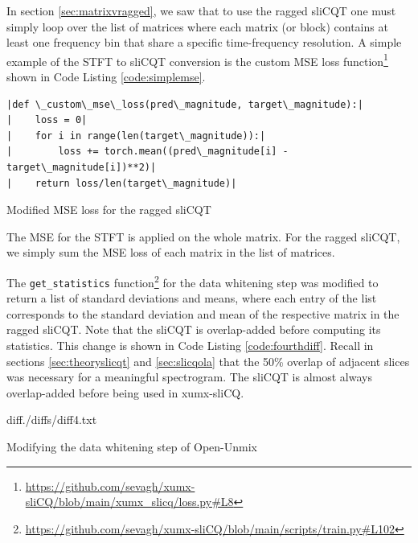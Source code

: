 \documentclass[report.tex]{subfiles}
\begin{document}
In section \ref{sec:matrixvragged}, we saw that to use the ragged sliCQT one must simply loop over the list of matrices where each matrix (or block) contains at least one frequency bin that share a specific time-frequency resolution. A simple example of the STFT to sliCQT conversion is the custom MSE loss function\footnote{\url{https://github.com/sevagh/xumx-sliCQ/blob/main/xumx_slicq/loss.py\#L8}} shown in Code Listing \ref{code:simplemse}.

\begin{listing}[h]
  \centering
\begin{verbatim}
|def \_custom\_mse\_loss(pred\_magnitude, target\_magnitude):|
|    loss = 0|
|    for i in range(len(target\_magnitude)):|
|        loss += torch.mean((pred\_magnitude[i] - target\_magnitude[i])**2)|
|    return loss/len(target\_magnitude)|
\end{verbatim}
  \caption{Modified MSE loss for the ragged sliCQT}
  \label{code:simplemse}
\end{listing}

The MSE for the STFT is applied on the whole matrix. For the ragged sliCQT, we simply sum the MSE loss of each matrix in the list of matrices.

The \Verb#get_statistics# function\footnote{\url{https://github.com/sevagh/xumx-sliCQ/blob/main/scripts/train.py\#L102}} for the data whitening step was modified to return a list of standard deviations and means, where each entry of the list corresponds to the standard deviation and mean of the respective matrix in the ragged sliCQT. Note that the sliCQT is overlap-added before computing its statistics. This change is shown in Code Listing \ref{code:fourthdiff}. Recall in sections \ref{sec:theoryslicqt} and \ref{sec:slicqola} that the 50\% overlap of adjacent slices was necessary for a meaningful spectrogram. The sliCQT is almost always overlap-added before being used in xumx-sliCQ.

\begin{listing}[ht]
  \centering
\begin{inputminted}[linenos,breaklines,frame=single,fontsize=\scriptsize]{diff}{./diffs/diff4.txt}
\end{inputminted}
  \caption{Modifying the data whitening step of Open-Unmix}
  \label{code:fourthdiff}
\end{listing}
\end{document}
